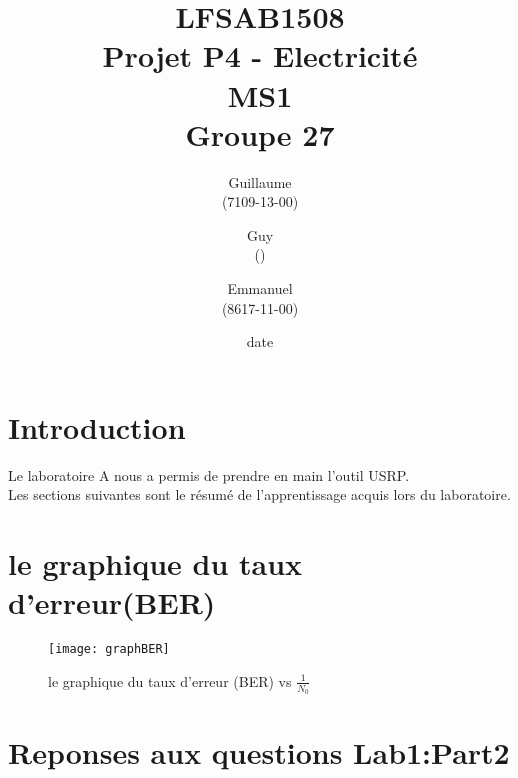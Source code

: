 \documentclass[11pt]{article}
\title{\textbf{LFSAB1508\\ Projet P4 - Electricité \\ MS1} \\ {\large Groupe 27}}
\author{Guillaume \bsc{Lamine} \\(7109-13-00) \and Guy \bsc{Mavungu Zola Lutete} \\()  \and Emmanuel \bsc{Dushimimana} \\ (8617-11-00)}
\date{date}
\date{\vspace*{25mm}
\texttt{[image: logo.jpg]}\\
		\vspace*{30mm} 
		\begin{center}
		Année académique 2015-2016 \\	
		\end{center}}
\begin{document}
\thispagestyle{empty}

\maketitle
\thispagestyle{empty}
\setcounter{tocdepth}{3}
\setcounter{page}{1}
\newpage


\section*{Introduction}
Le laboratoire A nous a permis de prendre en main l'outil USRP. \\ Les sections suivantes sont le résumé de l'apprentissage acquis lors du laboratoire.
\section{le graphique du taux d'erreur(BER)}
 \begin{figure}[!h]
     \centering
     \texttt{[image: graphBER]}
     \caption{le graphique du taux d'erreur (BER) vs $\frac{1}{N_0}$}
     \label{ber}
 \end{figure}
\section{}
\section{Reponses aux questions Lab1:Part2}
\subsection{}
\end{document}
